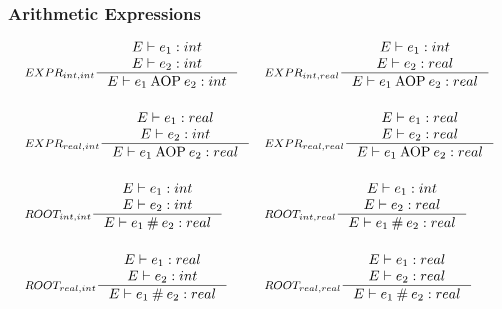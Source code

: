 \subsubsection{Arithmetic Expressions}
\begin{align*}
&\inference[$EXPR_{int,int}$]{E \vdash e_1 : int \\
                       E \vdash e_2 : int}
                    {E \vdash e_1 \mathbin{\textrm{AOP}} e_2 : int}
&
&\inference[$EXPR_{int,real}$]{E \vdash e_1 : int \\
                       E \vdash e_2 : real}
                    {E \vdash e_1 \mathbin{\textrm{AOP}} e_2 : real}
\\\\
&\inference[$EXPR_{real,int}$]{E \vdash e_1 : real \\
                       E \vdash e_2 : int}
                    {E \vdash e_1 \mathbin{\textrm{AOP}} e_2 : real}
&
&\inference[$EXPR_{real,real}$]{E \vdash e_1 : real \\
                       E \vdash e_2 : real}
                    {E \vdash e_1 \mathbin{\textrm{AOP}} e_2 : real}
\\\\  
&\inference[$ROOT_{int,int}$]{E \vdash e_1 : int \\
                       E \vdash e_2 : int}
                    {E \vdash e_1 \mathbin{\#} e_2 : real}
&
&\inference[$ROOT_{int,real}$]{E \vdash e_1 : int \\
                       E \vdash e_2 : real}
                    {E \vdash e_1 \mathbin{\#} e_2 : real}
\\\\
&\inference[$ROOT_{real,int}$]{E \vdash e_1 : real \\
                       E \vdash e_2 : int}
                    {E \vdash e_1 \mathbin{\#} e_2 : real}
&
&\inference[$ROOT_{real,real}$]{E \vdash e_1 : real \\
                       E \vdash e_2 : real}
                    {E \vdash e_1 \mathbin{\#} e_2 : real}
\end{align*}

